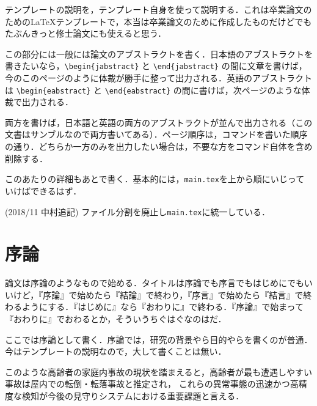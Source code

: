 \begin{jabstract}

テンプレートの説明を，テンプレート自身を使って説明する．これは卒業論文のための\LaTeX テンプレートで，本当は卒業論文のために作成したものだけどでもたぶんきっと修士論文にも使えると思う．

この部分には一般には論文のアブストラクトを書く．日本語のアブストラクトを書きたいなら，\verb|\begin{jabstract}| と \verb|\end{jabstract}| の間に文章を書けば，今のこのページのように体裁が勝手に整って出力される．英語のアブストラクトは \verb|\begin{eabstract}| と \verb|\end{eabstract}| の間に書けば，次ページのような体裁で出力される．

両方を書けば，日本語と英語の両方のアブストラクトが並んで出力される（この文書はサンブルなので両方書いてある）．ページ順序は，コマンドを書いた順序の通り．どちらか一方のみを出力したい場合は，不要な方をコマンド自体を含め削除する．

このあたりの詳細もあとで書く．基本的には，{\tt main.tex}を上から順にいじっていけばできるはず．

(2018/11 中村追記) ファイル分割を廃止し{\tt main.tex}に統一している．

\end{jabstract}

\tableofcontents	%
\listoffigures		%
\listoftables		%


\chapter{序論}
\label{chap_introduction}

論文は序論のようなもので始める．タイトルは序論でも序言でもはじめにでもいいけど，『序論』で始めたら『結論』で終わり，『序言』で始めたら『結言』で終わるようにする．『はじめに』なら『おわりに』で終わる．『序論』で始まって『おわりに』でおわるとか，そういうちぐはぐなのはだ．

ここでは序論として書く．序論では，研究の背景やら目的やらを書くのが普通．今はテンプレートの説明なので，大して書くことは無い．

このような高齢者の家庭内事故の現状を踏まえると，高齢者が最も遭遇しやすい事故は屋内での転倒・転落事故と推定され，
これらの異常事態の迅速かつ高精度な検知が今後の見守りシステムにおける重要課題と言える．

